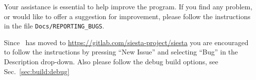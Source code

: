 Your assistance is essential to help improve the program. If you find
any problem, or would like to offer a suggestion for improvement,
please follow the instructions in the file
\texttt{Docs/REPORTING\_BUGS}.

Since \siesta\ has moved to
\url{https://gitlab.com/siesta-project/siesta} you are encouraged to
follow the instructions by pressing ``New Issue'' and selecting
``Bug'' in the Description drop-down. Also please follow the debug
build options, see Sec.~\ref{sec:build:debug}